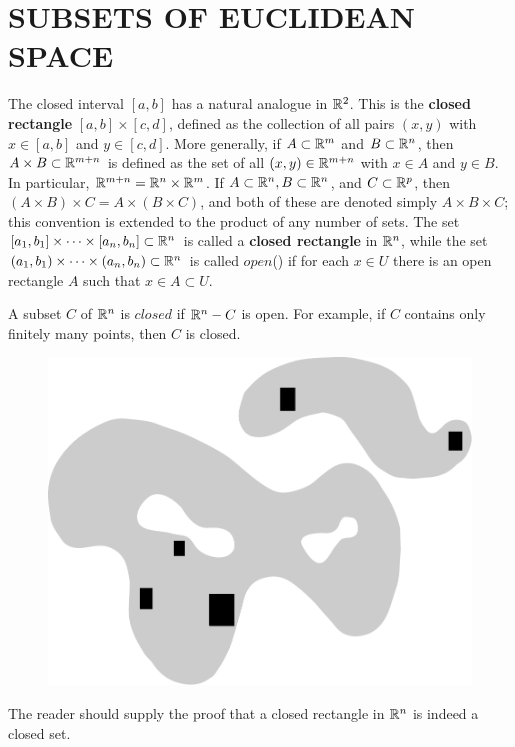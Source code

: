 \clearpage
\section{SUBSETS OF EUCLIDEAN SPACE}
The closed interval $[a,b]$ has a natural analogue in $\mathbb{R}^2$. 
This is the \textbf{closed rectangle} $[a,b]\times [c,d]$, 
defined as the collection of all pairs $(x,y)$ with $x\in [ a, b] $ and $y\in [c, d]$.
More generally, if $A\subset\mathbb{R}^m$ and $B\subset\mathbb{R}^n$, 
then $A\times B\subset\mathbb{R}^{m+n}$ is defined as the set of all  
$(x, y) \in \mathbb{R}^{m+n}$ with $x\in A$ and $y\in B$.
In particular, $\mathbb{R}^{m+n} = \mathbb{R}^n\times \mathbb{R}^m$.
If $A\subset \mathbb{R}^n, B\subset \mathbb{R}^n$, and $C\subset \mathbb{R}^p$,
then $(A\times B)\times C = A\times(B\times C)$, and 
both of these are denoted simply $A\times B\times C$; this 
convention is extended to the product of any number of sets.
The set $[a_1, b_1]\times \cdots \times [a_n,b_n]\subset \mathbb{R}^n$ 
is called a \textbf{closed rectangle} in $\mathbb{R}^n$, while the set 
$(a_1, b_1)\times \cdots \times (a_n,b_n)\subset \mathbb{R}^n$
is called $open$() if for each $x\in U$ there is an open 
rectangle $A$ such that $x\in A\subset U$.

A subset $C$ of $\mathbb{R}^n$ is $closed$ if $\mathbb{R}^n - C$ is open.
For example, if $C$ contains only finitely many points, then $C$ is 
closed.

\begin{figure}[!htb]
    \centering
    \includegraphics[width=.75\linewidth]{./pics/Fig1-1.pdf}
    \caption{}
    \label{Fig 1-1}
\end{figure}

The reader should supply the proof that a closed rectangle in
$\mathbb{R}^n$ is indeed a closed set.

